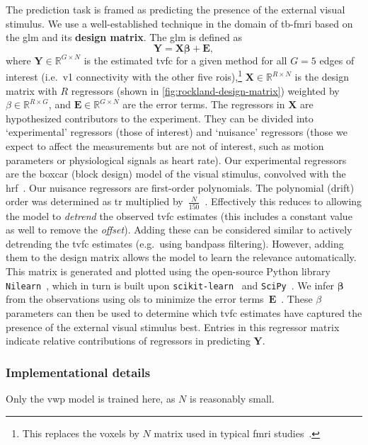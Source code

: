 The prediction task is framed as predicting the presence of the external visual stimulus.
We use a well-established technique in the domain of \gls{tb-fmri} based on the \gls{glm} and its \textbf{design matrix}.
The \gls{glm} is defined as
\begin{equation}
  \mathbf{Y} = \mathbf{X} \mathbf{\beta} + \mathbf{E},
\end{equation}
where $\mathbf{Y} \in \mathbb{R}^{G \times N}$ is the estimated \gls{tvfc} for a given method for all $G = 5$ edges of interest (i.e.~\gls{v1} connectivity with the other five \glspl{roi}),\footnote{This replaces the voxels by $N$ matrix used in typical \gls{fmri} studies~\parencite{Friston1995}.} $\mathbf{X} \in \mathbb{R}^{R \times N}$ is the design matrix with $R$ regressors (shown in \cref{fig:rockland-design-matrix}) weighted by $\beta \in \mathbb{R}^{R \times G}$, and $\mathbf{E} \in \mathbb{R}^{G \times N}$ are the error terms.
%
The regressors in $\mathbf{X}$ are hypothesized contributors to the experiment.
They can be divided into `experimental' regressors (those of interest) and `nuisance' regressors (those we expect to affect the measurements but are not of interest, such as motion parameters or physiological signals as heart rate).
Our experimental regressors are the boxcar (block design) model of the visual stimulus, convolved with the \gls{hrf}~\parencite{Glover1999}.
Our nuisance regressors are first-order polynomials.
The polynomial (drift) order was determined as \gls{tr} multiplied by~$\frac{N}{150}$~\parencite[see][for rationale]{Worsley2002}.
Effectively this reduces to allowing the model to \emph{detrend} the observed \gls{tvfc} estimates (this includes a constant value as well to remove the \emph{offset}).
Adding these can be considered similar to actively detrending the \gls{tvfc} estimates (e.g.~using bandpass filtering).
However, adding them to the design matrix allows the model to learn the relevance automatically.
This matrix is generated and plotted using the open-source Python library \texttt{Nilearn}~\parencite[][version~0.9.2]{Abraham2014}, which in turn is built upon \texttt{scikit-learn}~\parencite[][version~1.2.1]{Pedregosa2011} and \texttt{SciPy}~\parencite[][version~1.10.0]{SciPy2020}.
We infer $\mathbf{\beta}$ from the observations using \gls{ols} to minimize the error terms~$\mathbf{E}$~\parencite{Worsley1995}.
These $\beta$ parameters can then be used to determine which \gls{tvfc} estimates have captured the presence of the external visual stimulus best.
Entries in this regressor matrix indicate relative contributions of regressors in predicting $\mathbf{Y}$.

\subsubsection{Implementational details}

Only the \gls{vwp} model is trained here, as $N$ is reasonably small.
